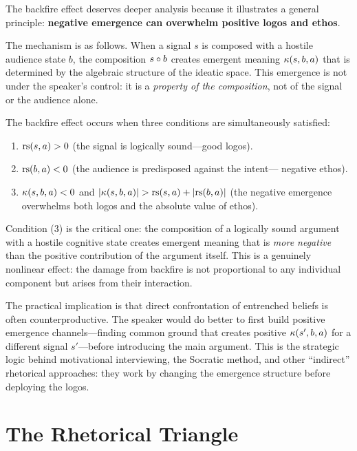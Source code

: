 \begin{remark}
\label{rem:backfire-mechanism}
The backfire effect deserves deeper analysis because it illustrates a
general principle: \textbf{negative emergence can overwhelm positive logos
and ethos}.

The mechanism is as follows.  When a signal $s$ is composed with a hostile
audience state $b$, the composition $s \circ b$ creates emergent meaning
$\kappa(s, b, a)$ that is determined by the algebraic structure of the
ideatic space.  This emergence is not under the speaker's control: it is a
\emph{property of the composition}, not of the signal or the audience alone.

The backfire effect occurs when three conditions are simultaneously
satisfied:
\begin{enumerate}
  \item $\mathrm{rs}(s, a) > 0$ (the signal is logically sound---good logos).
  \item $\mathrm{rs}(b, a) < 0$ (the audience is predisposed against the intent---
        negative ethos).
  \item $\kappa(s, b, a) < 0$ and $|\kappa(s, b, a)| > \mathrm{rs}(s, a) +
        |\mathrm{rs}(b, a)|$ (the negative emergence overwhelms both logos and
        the absolute value of ethos).
\end{enumerate}

Condition (3) is the critical one: the composition of a logically sound
argument with a hostile cognitive state creates emergent meaning that is
\emph{more negative} than the positive contribution of the argument itself.
This is a genuinely nonlinear effect: the damage from backfire is not
proportional to any individual component but arises from their interaction.

The practical implication is that direct confrontation of entrenched
beliefs is often counterproductive.  The speaker would do better to first
build positive emergence channels---finding common ground that creates
positive $\kappa(s', b, a)$ for a different signal $s'$---before
introducing the main argument.  This is the strategic logic behind
motivational interviewing, the Socratic method, and other ``indirect''
rhetorical approaches: they work by changing the emergence structure before
deploying the logos.
\end{remark}


\section{The Rhetorical Triangle}

